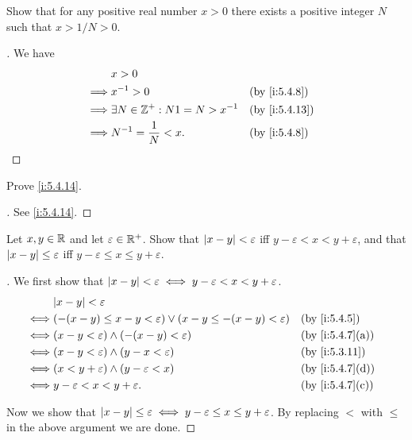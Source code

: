 \begin{ex}\label{i:ex:5.4.4}
  Show that for any positive real number \(x > 0\) there exists a positive integer \(N\) such that \(x > 1 / N > 0\).
\end{ex}

\begin{proof}[]
  We have
  \begin{align*}
             & x > 0                                                   \\
    \implies & x^{-1} > 0                           &  & \by{i:5.4.8}  \\
    \implies & \exists N \in \Z^+ : N1 = N > x^{-1} &  & \by{i:5.4.13} \\
    \implies & N^{-1} = \dfrac{1}{N} < x.           &  & \by{i:5.4.8}
  \end{align*}
\end{proof}

\begin{ex}\label{i:ex:5.4.5}
  Prove \cref{i:5.4.14}.
\end{ex}

\begin{proof}[]
  See \cref{i:5.4.14}.
\end{proof}

\begin{ex}\label{i:ex:5.4.6}
  Let \(x, y \in \mathbb{R}\) and let \(\varepsilon \in \mathbb{R}^+\).
  Show that \(\left\lvert x - y\right\rvert < \varepsilon\) iff \(y - \varepsilon < x < y + \varepsilon\), and that \(\left\lvert x - y\right\rvert \leq \varepsilon\) iff \(y - \varepsilon \leq x \leq y + \varepsilon\).
\end{ex}

\begin{proof}[]
  We first show that \(\left\lvert x - y\right\rvert < \varepsilon \iff y - \varepsilon < x < y + \varepsilon\).
  \begin{align*}
         & \abs{x - y} < \varepsilon                                                                               \\
    \iff & \pa{-(x - y) \leq x - y < \varepsilon} \lor \pa{x - y \leq -(x - y) < \varepsilon} &  & \by{i:5.4.5}    \\
    \iff & (x - y < \varepsilon) \land (-(x - y) < \varepsilon)                               &  & \by{i:5.4.7}[a] \\
    \iff & (x - y < \varepsilon) \land (y - x < \varepsilon)                                  &  & \by{i:5.3.11}   \\
    \iff & (x < y + \varepsilon) \land (y - \varepsilon < x)                                  &  & \by{i:5.4.7}[d] \\
    \iff & y - \varepsilon < x < y + \varepsilon.                                             &  & \by{i:5.4.7}[c]
  \end{align*}

  Now we show that \(\left\lvert x - y\right\rvert \leq \varepsilon \iff y - \varepsilon \leq x \leq y + \varepsilon\).
  By replacing \(<\) with \(\leq\) in the above argument we are done.
\end{proof}

